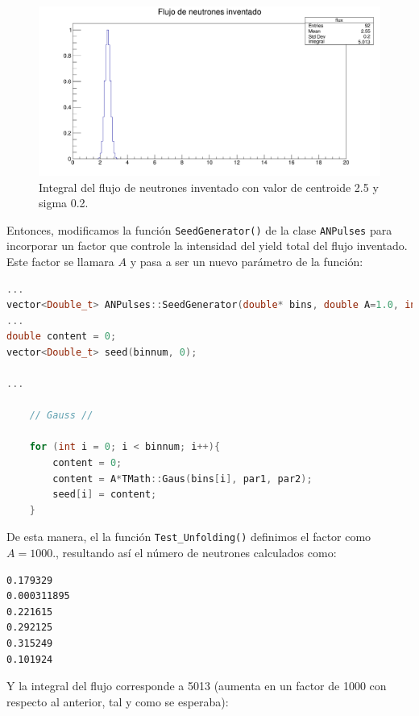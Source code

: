 \documentclass[11pt,letterpaper]{article}
\begin{document}
\begin{figure}[H]
\centering
    \includegraphics[width=1\textwidth]{img/c1_integral_sin_factor.png}
    \caption{Integral del flujo de neutrones inventado con valor de centroide 2.5 y sigma 0.2.} \label{flujo_inventado_sin_factor}
\end{figure}

Entonces, modificamos la función \verb|SeedGenerator()| de la clase \verb|ANPulses| para incorporar un factor que controle la intensidad del yield total del flujo inventado. Este factor se llamara $A$ y pasa a ser un nuevo parámetro de la función:

\begin{lstlisting}[language=C++]
...
vector<Double_t> ANPulses::SeedGenerator(double* bins, double A=1.0, int binnum, double par1, double par2)
...
double content = 0;
vector<Double_t> seed(binnum, 0);

...

	// Gauss //
	
	for (int i = 0; i < binnum; i++){
		content = 0;
		content = A*TMath::Gaus(bins[i], par1, par2);
		seed[i] = content;
	}
\end{lstlisting}

De esta manera, el la función \verb|Test_Unfolding()| definimos el factor como $A=1000.$, resultando así el número de neutrones calculados como:


\begin{lstlisting}[language=bash]
0.179329
0.000311895
0.221615
0.292125
0.315249
0.101924
\end{lstlisting}

Y la integral del flujo corresponde a 5013 (aumenta en un factor de 1000 con respecto al anterior, tal y como se esperaba):
\end{document}
